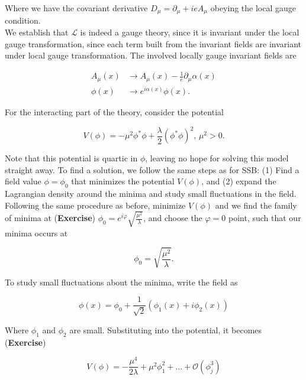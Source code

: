\noindent Where we have the covariant derivative $D_\mu = \partial_\mu + i e A_\mu$ obeying the local gauge condition. \\

\noindent We establish that $\mathcal{L}$ is indeed a gauge theory, since it is invariant under the local gauge transformation, since each term built from the invariant fields are invariant under local gauge transformation. The involved locally gauge invariant fields are

\begin{align}
A_\mu (x) &\rightarrow A_\mu(x) - \frac{1}{e} \partial_\mu \alpha (x) \\
\phi (x) &\rightarrow e^{i \alpha (x)} \phi (x).
\end{align}

\noindent For the interacting part of the theory, consider the potential

\begin{equation}
V(\phi) = -\mu^2 \phi^* \phi + \frac{\lambda}{2} (\phi^* \phi)^2 \text{, } \mu^2 > 0.
\end{equation}

\noindent Note that this potential is quartic in $\phi$, leaving no hope for solving this model straight away. To find a solution, we follow the same steps as for SSB: (1) Find a field value $\phi = \phi_0$ that minimizes the potential $V(\phi)$, and (2) expand the Lagrangian density around the minima and study small fluctuations in the field. \\

\noindent Following the same procedure as before, minimize $V(\phi)$ and we find the family of minima at (\textbf{Exercise}) $\phi_0 = e^{i \varphi} \sqrt{\frac{\mu^2}{\lambda}}$, and choose the $\varphi=0$ point, such that our minima occurs at 

\begin{equation}
\phi_0 = \sqrt{\frac{\mu^2}{\lambda}}.
\end{equation} 

\noindent To study small fluctuations about the minima, write the field as 

\begin{equation}
\phi (x) = \phi_0 + \frac{1}{\sqrt{2}} (\phi_1 (x) + i \phi_2 (x))
\end{equation}

\noindent Where $\phi_1$ and $\phi_2$ are small. Substituting into the potential, it becomes (\textbf{Exercise})

\begin{equation}
V(\phi) = -\frac{\mu^4}{2\lambda} + \mu^2 \phi_1^2 + \dots + \mathcal{O}(\phi_j^3)
\end{equation}

